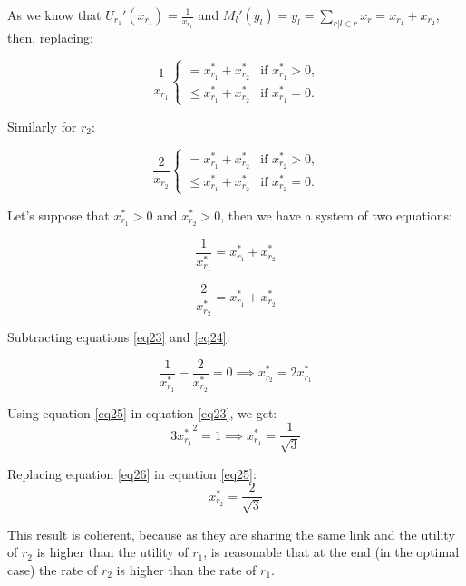 As we know that $U_{r_1}'(x_{r_1}) = \frac{1}{x_{r_1}}$ and $M_l'(y_l) = y_{l}=\sum\limits_{r | l \in r} x_r=x_{r_1}+x_{r_2}$, then, replacing:

\begin{equation}
\ \frac{1}{x_{r_1}}
\begin{cases}
= x^*_{r_1}+x^*_{r_2}  & \mbox{if } x^*_{r_1} > 0,\\ 
\leq x^*_{r_1}+x^*_{r_2} & \mbox{if } x^*_{r_1} = 0.
\end{cases}
\label{eq21}
\end{equation}

Similarly for ${r_2}$:

\begin{equation}
\ \frac{2}{x_{r_2}}
\begin{cases}
= x^*_{r_1}+x^*_{r_2}  & \mbox{if } x^*_{r_2} > 0,\\ 
\leq x^*_{r_1}+x^*_{r_2} & \mbox{if } x^*_{r_2} = 0.
\end{cases}
\label{eq22}
\end{equation}

Let's suppose that $x^*_{r_1} > 0$ and $x^*_{r_2} > 0$, then we have a system of two equations:

\begin{equation}
\frac{1}{x^*_{r_1}} = x^*_{r_1}+x^*_{r_2}
\label{eq23}
\end{equation}

\begin{equation}
\frac{2}{x^*_{r_2}} = x^*_{r_1}+x^*_{r_2}
\label{eq24}
\end{equation}

Subtracting equations \eqref{eq23} and \eqref{eq24}:

\begin{equation}
\frac{1}{x^*_{r_1}} - \frac{2}{x^*_{r_2}} = 0 \implies x^*_{r_2}=2x^*_{r_1}
\label{eq25}
\end{equation}

Using equation \eqref{eq25} in equation \eqref{eq23}, we get:
\begin{equation}
{3x^*_{r_1}}^2=1 \implies x^*_{r_1}=\frac{1}{\sqrt{3}}
\label{eq26}
\end{equation}

Replacing equation \eqref{eq26} in equation \eqref{eq25}:
\begin{equation}
x^*_{r_2}=\frac{2}{\sqrt{3}}
\label{eq27}
\end{equation}

This result is coherent, because as they are sharing the same link and the utility of $r_2$ is higher than the utility of $r_1$, is reasonable that at the end (in the optimal case) the rate of $r_2$ is higher than the rate of $r_1$.

